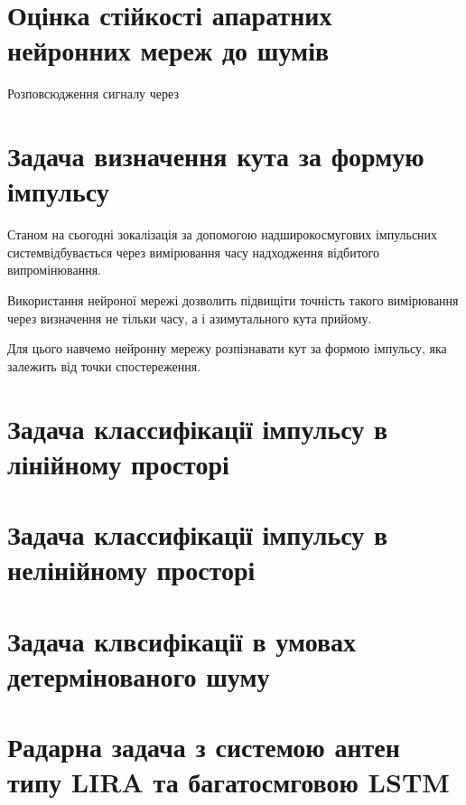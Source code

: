 \section{Оцінка стійкості апаратних нейронних мереж до шумів}

Розповсюдження сигналу через 

\section{Задача визначення кута за формую імпульсу}

Станом на сьогодні зокалізація за допомогою надширокосмугових імпульсних 
системвідбувається через вимірювання часу надходження відбитого 
випромінювання.

Використання нейроної мережі дозволить підвищіти точність такого 
вимірювання через визначення не тільки часу, а і азимутального 
кута прийому.

Для цього навчемо нейронну мережу розпізнавати кут за формою 
імпульсу, яка залежить від точки спостереження.

\section{Задача классифікації імпульсу в лінійному просторі}

\section{Задача классифікації імпульсу в нелінійному просторі}

\section{Задача клвсифікації в умовах детермінованого шуму}

\section{Радарна задача з системою антен типу LIRA та багатосмговою LSTM}
